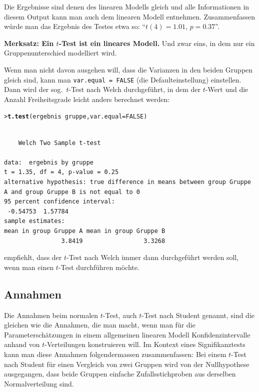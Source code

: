 \documentclass[oneside, 10pt]{book}\usepackage[]{graphicx}\usepackage[]{xcolor}
\makeatletter
\newcommand{\hlnum}[1]{\textcolor[rgb]{0.686,0.059,0.569}{#1}}%
\newcommand{\hlopt}[1]{\textcolor[rgb]{0,0,0}{#1}}%
\newcommand{\hlstd}[1]{\textcolor[rgb]{0.345,0.345,0.345}{#1}}%
\newcommand{\hlkwc}[1]{\textcolor[rgb]{0.333,0.667,0.333}{#1}}%
\newcommand{\hlkwd}[1]{\textcolor[rgb]{0.737,0.353,0.396}{\textbf{#1}}}%
\newenvironment{kframe}{%
 \def\at@end@of@kframe{}%
 \ifinner\ifhmode%
  \def\at@end@of@kframe{\end{minipage}}%
  \begin{minipage}{\columnwidth}%
 \fi\fi%
 \def\FrameCommand##1{\hskip\@totalleftmargin \hskip-\fboxsep
 \colorbox{shadecolor}{##1}\hskip-\fboxsep
     \hskip-\linewidth \hskip-\@totalleftmargin \hskip\columnwidth}%
 \MakeFramed {\advance\hsize-\width
   \@totalleftmargin\z@ \linewidth\hsize
   \@setminipage}}%
 {\par\unskip\endMakeFramed%
 \at@end@of@kframe}
\newenvironment{knitrout}{}{} %
\makeatother
\begin{document}
Die Ergebnisse sind denen des linearen Modells gleich
und alle Informationen in diesem Output kann man auch
dem linearen Modell entnehmen. Zusammenfassen würde man
das Ergebnis des Testes etwa so: ``$t(4) = 1.01$, $p = 0.37$''.

\medskip

\begin{framed}
\noindent \textbf{Merksatz: Ein $t$-Test ist ein lineares Modell.} Und zwar eins,
in dem nur ein Gruppenunterschied modelliert wird.
\end{framed}

\medskip

Wenn man nicht davon ausgehen will, dass die Varianzen
in den beiden Gruppen gleich sind, kann man
\texttt{var.equal = FALSE} (die Defaulteinstellung) einstellen.
Dann wird der sog.\ $t$-Test nach Welch durchgeführt,
in dem der $t$-Wert und die Anzahl Freiheitsgrade leicht anders
berechnet werden:

\begin{knitrout}
\color{fgcolor}\begin{kframe}
\begin{alltt}
\hlstd{> }\hlkwd{t.test}\hlstd{(ergebnis} \hlopt{~} \hlstd{gruppe,} \hlkwc{var.equal} \hlstd{=} \hlnum{FALSE}\hlstd{)}
\end{alltt}
\begin{verbatim}

	Welch Two Sample t-test

data:  ergebnis by gruppe
t = 1.35, df = 4, p-value = 0.25
alternative hypothesis: true difference in means between group Gruppe A and group Gruppe B is not equal to 0
95 percent confidence interval:
 -0.54753  1.57784
sample estimates:
mean in group Gruppe A mean in group Gruppe B 
                3.8419                 3.3268 
\end{verbatim}
\end{kframe}
\end{knitrout}

\citet{Ruxton2006} empfiehlt, dass der $t$-Test nach Welch
immer dann durchgeführt werden soll, wenn man einen $t$-Test
durchführen möchte.

\subsection{Annahmen}
Die Annahmen beim normalen $t$-Test, auch $t$-Test nach Student genannt,
sind die gleichen wie die
Annahmen, die man macht, wenn man für die Parameterschätzungen
in einem allgemeinen linearen Modell Konfidenzintervalle
anhand von $t$-Verteilungen konstruieren will. Im Kontext eines
Signifikanztests kann man diese Annahmen folgendermassen zusammenfassen:
Bei einem $t$-Test nach Student für einen Vergleich von zwei Gruppen
wird von der Nullhypothese ausgegangen, dass beide Gruppen einfache
Zufallsstichproben aus derselben Normalverteilung sind.
\end{document}
